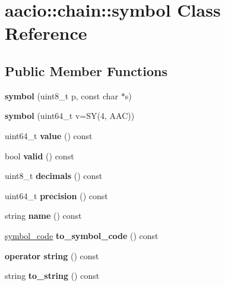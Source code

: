 \hypertarget{classaacio_1_1chain_1_1symbol}{}\section{aacio\+:\+:chain\+:\+:symbol Class Reference}
\label{classaacio_1_1chain_1_1symbol}
\subsection*{Public Member Functions}
\begin{DoxyCompactItemize}
\item 
\mbox{\label{classaacio_1_1chain_1_1symbol_a33428236f0d810eec825cb1c49d2ad6e}} 
{\bfseries symbol} (uint8\+\_\+t p, const char $\ast$s)
\item 
\mbox{\label{classaacio_1_1chain_1_1symbol_a165cadbfa1da9933845b7097883acbfd}} 
{\bfseries symbol} (uint64\+\_\+t v=SY(4, A\+AC))
\item 
\mbox{\label{classaacio_1_1chain_1_1symbol_af059b56ab4254156b6848eb4d1bb9771}} 
uint64\+\_\+t {\bfseries value} () const
\item 
\mbox{\label{classaacio_1_1chain_1_1symbol_aadbfeabe9987d2f2505e68cd5fcd6e6d}} 
bool {\bfseries valid} () const
\item 
\mbox{\label{classaacio_1_1chain_1_1symbol_a863843dc4d1168635cbe96f6e3344b08}} 
uint8\+\_\+t {\bfseries decimals} () const
\item 
\mbox{\label{classaacio_1_1chain_1_1symbol_aaa79d9d8dec2aa8cd69002baa9df8289}} 
uint64\+\_\+t {\bfseries precision} () const
\item 
\mbox{\label{classaacio_1_1chain_1_1symbol_a717fb9fc8baae4414356eb57cbc5050e}} 
string {\bfseries name} () const
\item 
\mbox{\label{classaacio_1_1chain_1_1symbol_abd82f8382be1faf04950e00d782ccb76}} 
\mbox{\hyperlink{structaacio_1_1chain_1_1symbol__code}{symbol\+\_\+code}} {\bfseries to\+\_\+symbol\+\_\+code} () const
\item 
\mbox{\label{classaacio_1_1chain_1_1symbol_a1f4049a8f66649fef4296c1753ea6803}} 
{\bfseries operator string} () const
\item 
\mbox{\label{classaacio_1_1chain_1_1symbol_a445898092bef3321a2b14ac2c27c9993}} 
string {\bfseries to\+\_\+string} () const
\end{DoxyCompactItemize}
